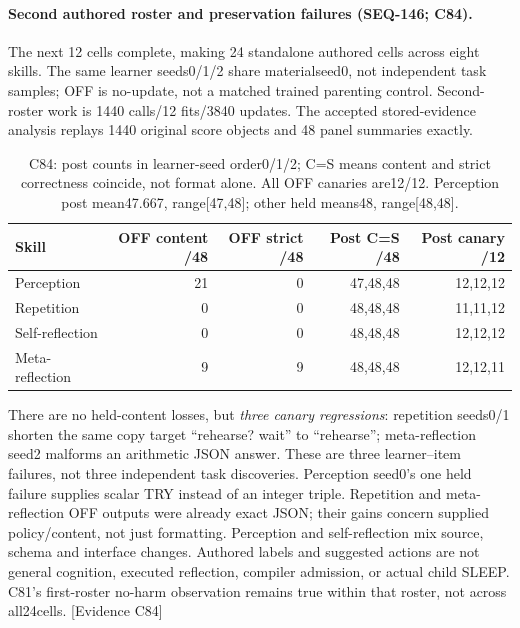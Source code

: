 \documentclass{article}
\begin{document}
\paragraph{Second authored roster and preservation failures (SEQ-146; C84).}
The next 12 cells complete, making 24 standalone authored cells across eight
skills. The same learner seeds0/1/2 share materialseed0, not independent task
samples; OFF is no-update, not a matched trained parenting control. Second-roster
work is 1440 calls/12 fits/3840 updates. The accepted stored-evidence analysis
replays 1440 original score objects and 48 panel summaries exactly.
\begin{table}[htbp]
\centering\small
\begin{tabular}{lrrrr}
\toprule
Skill & OFF content /48 & OFF strict /48 & Post C=S /48 & Post canary /12 \\
\midrule
Perception & 21 & 0 & 47,48,48 & 12,12,12 \\
Repetition & 0 & 0 & 48,48,48 & 11,11,12 \\
Self-reflection & 0 & 0 & 48,48,48 & 12,12,12 \\
Meta-reflection & 9 & 9 & 48,48,48 & 12,12,11 \\
\bottomrule
\end{tabular}
\caption{C84: post counts in learner-seed order0/1/2; C=S means content and
strict correctness coincide, not format alone. All OFF canaries are12/12.
Perception post mean47.667, range[47,48]; other held means48, range[48,48].}
\label{tab:seq146-skills}
\end{table}
There are no held-content losses, but \emph{three canary regressions}:
repetition seeds0/1 shorten the same copy target ``rehearse? wait'' to
``rehearse''; meta-reflection seed2 malforms an arithmetic JSON answer.
These are three learner--item failures, not three independent task discoveries.
Perception seed0's one held failure supplies scalar TRY instead of an integer
triple. Repetition and meta-reflection OFF outputs were already exact JSON;
their gains concern supplied policy/content, not just formatting. Perception
and self-reflection mix source, schema and interface changes. Authored labels
and suggested actions are not general cognition, executed reflection, compiler
admission, or actual child SLEEP. C81's first-roster no-harm observation remains
true within that roster, not across all24cells. \textsf{[Evidence C84]}
\end{document}
